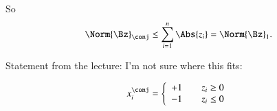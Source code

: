 So
\begin{equation}\label{eqn:convex-optimizationLecture2:284}
\Norm{\Bz}_\conj
\le
\sum_{i=1}^n \Abs{z_i}
=
\Norm{\Bz}_1.
\end{equation}

Statement from the lecture: I'm not sure where this fits:

\begin{equation}\label{eqn:convex-optimizationLecture2:304}
x_i^\conj
=
\left\{
\begin{array}{l l}
+1 & \quad \mbox{\( z_i \ge 0 \)} \\
-1 & \quad \mbox{\( z_i \le 0 \)}
\end{array}
\right.
\end{equation}


